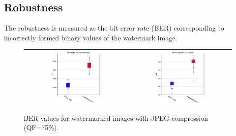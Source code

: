 \documentclass[runningheads]{llncs}
\begin{document}
\subsection{Robustness}
The robustness is measured as the bit error rate (BER) corresponding to incorrectly formed binary values of the watermark image.
\begin{figure}[H]
	\begin{center}
		\begin{tabular}{|c|c|}\hline
			\includegraphics[width=0.5\textwidth]{BER75SaintGall.eps}
			&\includegraphics[width=0.5\textwidth]{BER75Parzival.eps}\\\hline
		\end{tabular}
	\end{center}
	\caption{BER values for watermarked images with JPEG compression (QF=75\%).}
	\label{ber75}
\end{figure}
\end{document}
